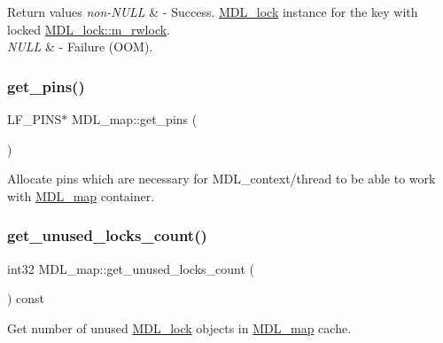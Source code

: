 \begin{DoxyRetVals}{Return values}
{\em non-\/\+N\+U\+LL} & -\/ Success. \mbox{\hyperlink{classMDL__lock}{M\+D\+L\+\_\+lock}} instance for the key with locked \mbox{\hyperlink{classMDL__lock_a1308b4506d8cb6d754b4f173e3aa4962}{M\+D\+L\+\_\+lock\+::m\+\_\+rwlock}}. \\
\hline
{\em N\+U\+LL} & -\/ Failure (O\+OM). \\
\hline
\end{DoxyRetVals}
\mbox{\label{classMDL__map_a1f761cb64053bfe1f1239be0095efcf5}} 
\subsubsection{\texorpdfstring{get\+\_\+pins()}{get\_pins()}}
{\footnotesize\ttfamily L\+F\+\_\+\+P\+I\+NS$\ast$ M\+D\+L\+\_\+map\+::get\+\_\+pins (\begin{DoxyParamCaption}{ }\end{DoxyParamCaption})\hspace{0.3cm}{\ttfamily [inline]}}

Allocate pins which are necessary for M\+D\+L\+\_\+context/thread to be able to work with \mbox{\hyperlink{classMDL__map}{M\+D\+L\+\_\+map}} container. \mbox{\label{classMDL__map_af4c5043a0a8b8deac2a1d330c174056d}} 
\subsubsection{\texorpdfstring{get\+\_\+unused\+\_\+locks\+\_\+count()}{get\_unused\_locks\_count()}}
{\footnotesize\ttfamily int32 M\+D\+L\+\_\+map\+::get\+\_\+unused\+\_\+locks\+\_\+count (\begin{DoxyParamCaption}{ }\end{DoxyParamCaption}) const\hspace{0.3cm}{\ttfamily [inline]}}

Get number of unused \mbox{\hyperlink{classMDL__lock}{M\+D\+L\+\_\+lock}} objects in \mbox{\hyperlink{classMDL__map}{M\+D\+L\+\_\+map}} cache.

